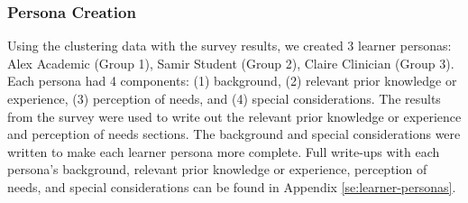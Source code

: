 \documentclass[020-persona\_validation.tex]{subfiles}
\begin{document}
    \subsubsection{Persona Creation}

        Using the clustering data with the survey results, we created 3 learner personas:
        Alex Academic (Group 1), Samir Student (Group 2), Claire Clinician (Group 3).
        Each persona had 4 components: (1) background, (2) relevant prior knowledge or experience,
        (3) perception of needs, and (4) special considerations.
        The results from the survey were used to write out the
        relevant prior knowledge or experience and perception of needs sections.
        The background and special considerations were written to make each learner persona more complete.
        Full write-ups with each persona's
        background, relevant prior knowledge or experience, perception of needs, and special considerations
        can be found in Appendix \ref{se:learner-personas}.
\end{document}
